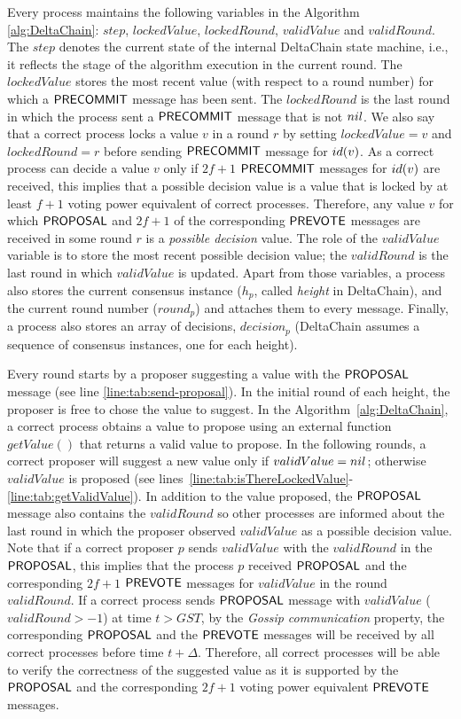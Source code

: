 Every process maintains the following variables in the Algorithm
\ref{alg:DeltaChain}: $step$, $lockedValue$, $lockedRound$, $validValue$ and
$validRound$. The $step$ denotes the current state of the internal DeltaChain
state machine, i.e., it reflects the stage of the algorithm execution in the
current round. The $lockedValue$ stores the most recent value (with respect to
a round number) for which a $\mathsf{PRECOMMIT}$ message has been sent. The
$lockedRound$ is the last round in which the process sent a $\mathsf{PRECOMMIT}$
message that is not $nil$. We also say that a correct process locks a value
$v$ in a round $r$ by setting $lockedValue = v$ and $lockedRound = r$ before
sending $\mathsf{PRECOMMIT}$ message for $id(v)$. As a correct process can decide a
value $v$ only if $2f+1$ $\mathsf{PRECOMMIT}$ messages for $id(v)$ are received, this
implies that a possible decision value is a value that is locked by at least
$f+1$ voting power equivalent of correct processes. Therefore, any value $v$
for which $\mathsf{PROPOSAL}$ and $2f+1$ of the corresponding $\mathsf{PREVOTE}$ messages are
received in some round $r$ is a \emph{possible decision} value. The role of the
$validValue$ variable is to store the most recent possible decision value; the
$validRound$ is the last round in which $validValue$ is updated. Apart from
those variables, a process also stores the current consensus instance ($h_p$,
called \emph{height} in DeltaChain), and the current round number ($round_p$)
and attaches them to every message. Finally, a process also stores an array of
decisions, $decision_p$ (DeltaChain assumes a sequence of consensus instances,
one for each height).

Every round starts by a proposer suggesting a value with the $\mathsf{PROPOSAL}$
message (see line \ref{line:tab:send-proposal}). In the initial round of each
height, the proposer is free to chose the value to suggest. In the
Algorithm~\ref{alg:DeltaChain}, a correct process obtains a value to propose
using an external function    $getValue()$ that returns a valid value to
propose. In the following rounds, a correct proposer will suggest a new value
only if $validValue = nil$; otherwise $validValue$ is proposed (see
lines~\ref{line:tab:isThereLockedValue}-\ref{line:tab:getValidValue}). 
In addition to the value proposed, the $\mathsf{PROPOSAL}$ message also
contains the $validRound$ so other processes are informed about the last round
in which the proposer observed $validValue$ as a possible decision value.
Note that if a correct proposer $p$ sends $validValue$ with the $validRound$ in the
$\mathsf{PROPOSAL}$, this implies that the process $p$ received $\mathsf{PROPOSAL}$ and the
corresponding $2f+1$ $\mathsf{PREVOTE}$ messages for $validValue$ in the round
$validRound$. 
If a correct process sends $\mathsf{PROPOSAL}$ message with $validValue$ ($validRound > -1$)
at time $t > GST$, by the \emph{Gossip communication} property, the
corresponding $\mathsf{PROPOSAL}$ and the $\mathsf{PREVOTE}$ messages will be received by all
correct processes before time $t+\Delta$. Therefore, all correct processes will
be able to verify the correctness of the suggested value as it is supported by
the $\mathsf{PROPOSAL}$ and the corresponding $2f+1$ voting power equivalent $\mathsf{PREVOTE}$
messages.   

